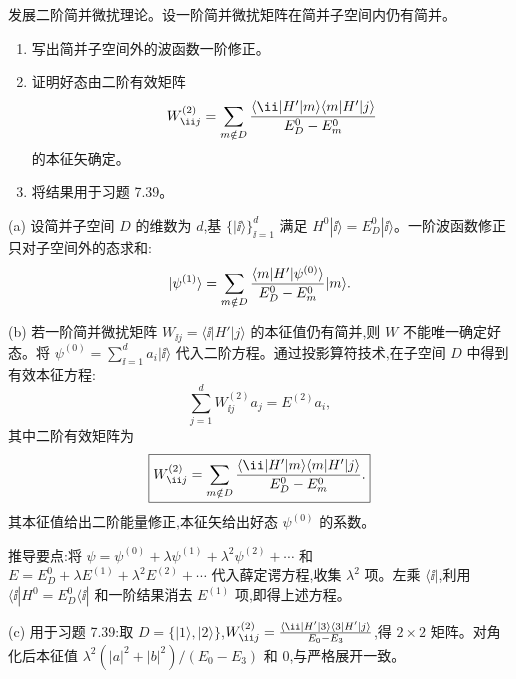 \begin{question}
发展二阶简并微扰理论。设一阶简并微扰矩阵在简并子空间内仍有简并。
\begin{enumerate}
\item 写出简并子空间外的波函数一阶修正。
\item 证明好态由二阶有效矩阵
\[
W^{(2)}_{\ii j}=\sum_{m\notin D}{\langle \ii|H'|m\rangle\langle m|H'|j\rangle\over E_D^0-E_m^0}
\]
的本征矢确定。
\item 将结果用于习题 7.39。
\end{enumerate}
\begin{solution}
(a) 设简并子空间 $D$ 的维数为 $d$,基 $\{|\ii\rangle\}_{\ii=1}^d$ 满足 $H^0|\ii\rangle=E_D^0|\ii\rangle$。一阶波函数修正只对子空间外的态求和:
\[
|\psi^{(1)}\rangle = \sum_{m\notin D} {\langle m|H'|\psi^{(0)}\rangle\over E_D^0-E_m^0}|m\rangle.
\]

(b) 若一阶简并微扰矩阵 $W_{\ii j}=\langle \ii|H'|j\rangle$ 的本征值仍有简并,则 $W$ 不能唯一确定好态。将 $\psi^{(0)}=\sum_{\ii=1}^d a_i|\ii\rangle$ 代入二阶方程。通过投影算符技术,在子空间 $D$ 中得到有效本征方程:
\[
\sum_{j=1}^d W^{(2)}_{\ii j} a_j = E^{(2)} a_i,
\]
其中二阶有效矩阵为
\[
\boxed{W^{(2)}_{\ii j} = \sum_{m\notin D} {\langle \ii|H'|m\rangle\langle m|H'|j\rangle\over E_D^0 - E_m^0}.}
\]
其本征值给出二阶能量修正,本征矢给出好态 $\psi^{(0)}$ 的系数。

推导要点:将 $\psi=\psi^{(0)}+\lambda\psi^{(1)}+\lambda^2\psi^{(2)}+\cdots$ 和 $E=E_D^0+\lambda E^{(1)}+\lambda^2 E^{(2)}+\cdots$ 代入薛定谔方程,收集 $\lambda^2$ 项。左乘 $\langle \ii|$,利用 $\langle \ii|H^0=E_D^0\langle \ii|$ 和一阶结果消去 $E^{(1)}$ 项,即得上述方程。

(c) 用于习题 7.39:取 $D=\{|1\rangle,|2\rangle\}$,$W^{(2)}_{\ii j}={\langle \ii|H'|3\rangle\langle 3|H'|j\rangle\over E_0-E_3}$,得 $2\times2$ 矩阵。对角化后本征值 $\lambda^2(|a|^2+|b|^2)/(E_0-E_3)$ 和 $0$,与严格展开一致。
\end{solution}
\end{question}

